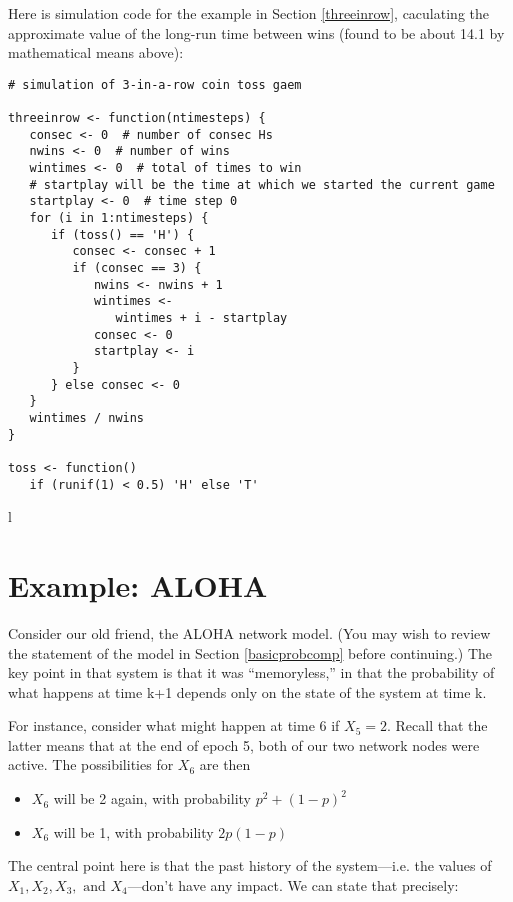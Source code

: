 Here is simulation code for the example in Section \ref{threeinrow},
caculating the approximate value of the long-run time between wins
(found to be about 14.1 by mathematical means above):

\begin{lstlisting}
# simulation of 3-in-a-row coin toss gaem

threeinrow <- function(ntimesteps) {
   consec <- 0  # number of consec Hs
   nwins <- 0  # number of wins
   wintimes <- 0  # total of times to win
   # startplay will be the time at which we started the current game
   startplay <- 0  # time step 0
   for (i in 1:ntimesteps) {
      if (toss() == 'H') {
         consec <- consec + 1 
         if (consec == 3) {
            nwins <- nwins + 1
            wintimes <- 
               wintimes + i - startplay
            consec <- 0
            startplay <- i
         }
      } else consec <- 0
   }
   wintimes / nwins
}

toss <- function() 
   if (runif(1) < 0.5) 'H' else 'T'
\end{lstlisting}l

\section{Example:  ALOHA}

Consider our old friend, the ALOHA network model.  (You
may wish to review the statement of the model in Section
\ref{basicprobcomp} before continuing.)  The key point in that system is
that it was ``memoryless,'' in that the probability of what happens at
time k+1 depends only on the state of the system at time k.

For instance, consider what might happen at time 6 if $X_5 = 2$.  Recall
that the latter means that at the end of epoch 5, both of our two
network nodes were active.  The possibilities for $X_6$ are then

\begin{itemize}

\item $X_6$ will be 2 again, with probability $p^2 + (1-p)^2$

\item $X_6$ will be 1, with probability $2p(1-p)$

\end{itemize}

The central point here is that the past history of the system---i.e. the
values of $X_1, X_2, X_3, \textrm{ and } X_4$---don't have any impact.
We can state that precisely:

